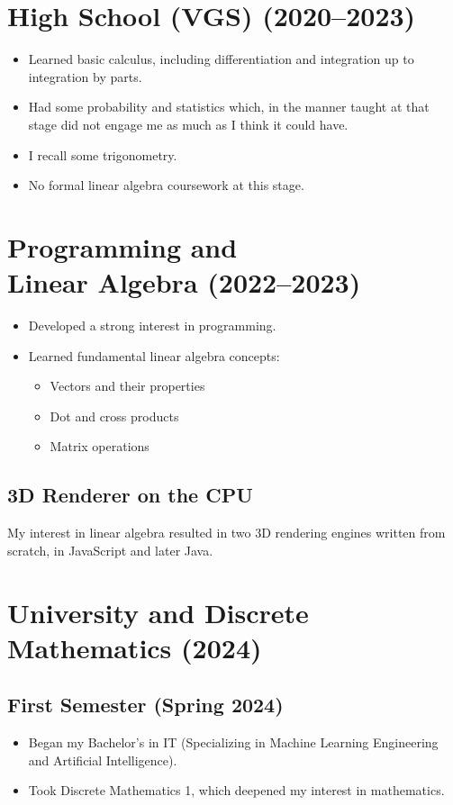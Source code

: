 \documentclass{article}
\begin{document}
\break
\section{High School (VGS) (2020--2023)}
\begin{itemize}
    \item Learned basic calculus, including differentiation and integration up to integration by parts.
    \item Had some probability and statistics which, in the manner 
        taught at that stage did not engage me as much as I think it could have.
    \item I recall some trigonometry.
    \item No formal linear algebra coursework at this stage.
\end{itemize}

\section[Programming and Linear Algebra (2022--2023)]{Programming and \\ Linear Algebra (2022--2023)}
\begin{itemize}
    \item Developed a strong interest in programming.
    \item Learned fundamental linear algebra concepts:
    \begin{itemize}
        \item Vectors and their properties
        \item Dot and cross products
        \item Matrix operations
    \end{itemize}
\end{itemize}
\subsection*{3D Renderer on the CPU}
My interest in linear algebra resulted in two 3D rendering engines written from scratch, in JavaScript and later Java. 

\break
\section{University and Discrete Mathematics (2024)}
\subsection{First Semester (Spring 2024)}
\begin{itemize}
    \item Began my Bachelor’s in IT (Specializing in Machine Learning Engineering and Artificial Intelligence).
    \item Took Discrete Mathematics 1, which deepened my interest in mathematics.
\end{itemize}
\end{document}
